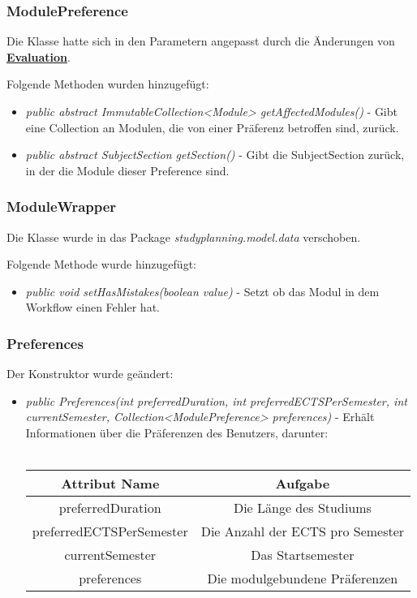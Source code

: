 \documentclass[parskip=full]{scrartcl}
\begin{document}
			\subsubsection{ModulePreference}
				Die Klasse hatte sich in den Parametern angepasst durch die Änderungen von \hyperlink{model:Evaluation}{\textbf{Evaluation}}.
				
				Folgende Methoden wurden hinzugefügt:
				\begin{itemize}
					\item \textit{public abstract ImmutableCollection<Module> getAffectedModules()} - Gibt eine Collection an Modulen, die von einer Präferenz betroffen sind, zurück.
					\item \textit{public abstract SubjectSection getSection()} - Gibt die SubjectSection zurück, in der die Module dieser Preference sind.
				\end{itemize}
			
			\subsubsection{ModuleWrapper}
				Die Klasse wurde in das Package \textit{studyplanning.model.data} verschoben.
				
				Folgende Methode wurde hinzugefügt:
				\begin{itemize}
					\item\textit{public void setHasMistakes(boolean value)} - Setzt ob das Modul in dem Workflow einen Fehler hat.
				\end{itemize}
			
			\subsubsection{Preferences}
				Der Konstruktor wurde geändert:
				\begin{itemize}
					\item \textit{public Preferences(int preferredDuration, int preferredECTSPerSemester, int currentSemester, Collection<ModulePreference> preferences)} - Erhält Informationen über die Präferenzen des Benutzers, darunter:
					\\ \\
						\begin{tabular}{|c|c|}
							\hline 
							\textbf{Attribut Name} & \textbf{Aufgabe} \\
							\hline
							preferredDuration & Die Länge des Studiums \\ 

							preferredECTSPerSemester & Die Anzahl der ECTS pro Semester \\ 

							currentSemester & Das Startsemester \\ 

							preferences & Die modulgebundene Präferenzen \\ 
							\hline 
						\end{tabular} 
				\end{itemize}
			
\end{document}
